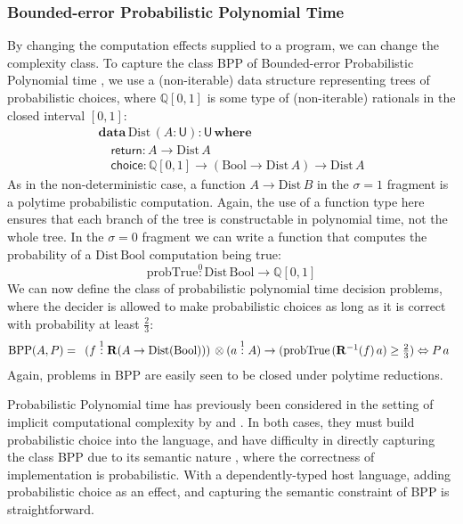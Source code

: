 \documentclass[acmsmall,screen]{acmart}
\newcommand{\BoolTy}{\mathrm{Bool}}
\begin{document}
\subsubsection{Bounded-error Probabilistic Polynomial Time}

By changing the computation effects supplied to a program, we can
change the complexity class. To capture the class BPP of Bounded-error
Probabilistic Polynomial time \cite{AroraBarak09}, we use a
(non-iterable) data structure representing trees of probabilistic
choices, where $\mathbb{Q}[0,1]$ is some type of (non-iterable)
rationals in the closed interval $[0,1]$:
\begin{displaymath}
  \begin{array}{l}
    \textbf{data}\,\mathrm{Dist}\,(A : \mathsf{U}) : \mathsf{U}\,\textbf{where} \\
    \quad \mathsf{return} : A \to \mathrm{Dist}\,A \\
    \quad \mathsf{choice} : \mathbb{Q}[0,1] \to (\BoolTy \to \mathrm{Dist}\,A) \to \mathrm{Dist}\,A
  \end{array}
\end{displaymath}
As in the non-deterministic case, a function $A \to \mathrm{Dist}\,B$
in the $\sigma = 1$ fragment is a polytime probabilistic
computation. Again, the use of a function type here ensures that each
branch of the tree is constructable in polynomial time, not the whole
tree. In the $\sigma = 0$ fragment we can write a function that
computes the probability of a $\mathrm{Dist}\,\BoolTy$ computation
being true:
\begin{displaymath}
  \mathrm{probTrue} \stackrel0: \mathrm{Dist}\,\BoolTy \to \mathbb{Q}[0,1]
\end{displaymath}
We can now define the class of probabilistic polynomial time decision
problems, where the decider is allowed to make probabilistic choices
as long as it is correct with probability at least $\frac{2}{3}$:
\begin{displaymath}
  \mathrm{BPP}(A,P) =
  \begin{array}[t]{l}
    (f \stackrel1: \mathbf{R}(A \to \mathrm{Dist}(\BoolTy))) \, \otimes
    (a \stackrel1: A) \to (\mathrm{probTrue}\,(\mathbf{R}^{-1}(f)\,a) \geq \frac{2}{3}) \Leftrightarrow P\,a
  \end{array}
\end{displaymath}
Again, problems in BPP are easily seen to be closed under polytime
reductions.

Probabilistic Polynomial time has previously been considered in the
setting of implicit computational complexity by
\citet{dallago_et_al:LIPIcs.MFCS.2021.35} and \citet{LagoT15}. In both
cases, they must build probabilistic choice into the language, and
have difficulty in directly capturing the class BPP due to its
semantic nature \cite{AroraBarak09}, where the correctness of
implementation is probabilistic. With a dependently-typed host
language, adding probabilistic choice as an effect, and capturing the
semantic constraint of BPP is straightforward.
\end{document}
